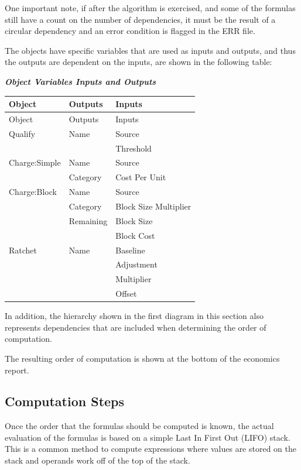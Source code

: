 One important note, if after the algorithm is exercised, and some of the formulas still have a count on the number of dependencies, it must be the result of a circular dependency and an error condition is flagged in the ERR file.

The objects have specific variables that are used as inputs and outputs, and thus the outputs are dependent on the inputs, are shown in the following table:

\textbf{\emph{Object Variables Inputs and Outputs}}

\begin{longtable}[c]{@{}lll@{}}
\toprule 
Object & Outputs & Inputs \tabularnewline
\midrule
\endfirsthead

\toprule 
Object & Outputs & Inputs \tabularnewline
\midrule
\endhead

Qualify & Name & Source \tabularnewline
~ & ~ & Threshold \tabularnewline
Charge:Simple & Name & Source \tabularnewline
~ & Category & Cost Per Unit \tabularnewline
Charge:Block & Name & Source \tabularnewline
~ & Category & Block Size Multiplier \tabularnewline
~ & Remaining & Block Size \tabularnewline
~ & ~ & Block Cost \tabularnewline
Ratchet & Name & Baseline \tabularnewline
~ & ~ & Adjustment \tabularnewline
~ & ~ & Multiplier \tabularnewline
~ & ~ & Offset \tabularnewline
\bottomrule
\end{longtable}

In addition, the hierarchy shown in the first diagram in this section also represents dependencies that are included when determining the order of computation.

The resulting order of computation is shown at the bottom of the economics report.

\subsection{Computation Steps}\label{computation-steps}

Once the order that the formulas should be computed is known, the actual evaluation of the formulas is based on a simple Last In First Out (LIFO) stack.~ This is a common method to compute expressions where values are stored on the stack and operands work off of the top of the stack.
